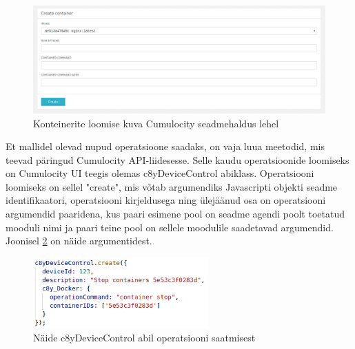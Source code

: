 \documentclass[12pt]{article}
\begin{document}
 \FloatBarrier

 \begin{figure} [ht] %
 \begin{center}
 \includegraphics[width=1\textwidth]{webplugin_containers_run}
 \caption{Konteinerite loomise kuva Cumulocity seadmehaldus lehel}
 \label{fig:webplugin_containers_run}
 \end{center}
 \end{figure}
 
 \FloatBarrier


 Et mallidel olevad nupud operatsioone saadaks, on vaja luua meetodid, mis teevad päringud
 Cumulocity API-liidesesse.
 Selle kaudu operatsioonide loomiseks on Cumulocity UI teegis olemas c8yDeviceControl abiklass.
 Operatsiooni loomiseks on sellel "create", mis võtab argumendiks Javascripti objekti
 seadme identifikaatori, operatsiooni kirjeldusega ning ülejäänud osa on operatsiooni argumendid
 paaridena, kus paari esimene pool on seadme agendi poolt toetatud mooduli nimi ja paari teine
 pool on sellele moodulile saadetavad argumendid. Joonisel \ref{fig:webplugin_operationsendexample}
 on näide argumentidest.

 \begin{figure} [ht] %
 \begin{center}
 \includegraphics[width=0.6\textwidth]{webplugin_operationsendexample}
 \caption{Näide c8yDeviceControl abil operatsiooni saatmisest}
 \label{fig:webplugin_operationsendexample}
 \end{center}
 \end{figure}
 
\end{document}
